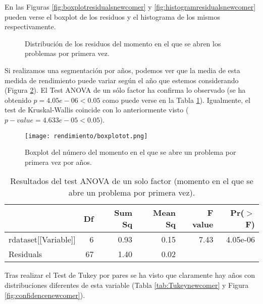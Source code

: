 En las Figuras \ref{fig:boxplotresidualsnewcomer} y \ref{fig:histogramresidualsnewcomer} pueden verse el boxplot de los residuos y el histograma de los mismos respectivamente.

\begin{figure}[H]
\centering
{}\qquad
{}
\caption{Distribución de los residuos del momento en el que se abren los problemas por primera vez.}
\label{fig:newcomer}
\end{figure}

Si realizamos una segmentación por años, podemos ver que la media de esta medida de rendimiento puede variar según el año que estemos considerando (Figura \ref{fig:boxplotnewcomer}). El Test ANOVA de un sólo factor ha confirma lo observado (se ha obtenido $p = 4.05e-06 < 0.05$ como puede verse en la Tabla \ref{tab:ANOVAnewcomer}). Igualmente, el test de Kruskal-Wallis coincide con lo anteriormente visto ($p-value = 4.633e-05 < 0.05$).

\begin{figure}[H]
    \centering
    \texttt{[image: rendimiento/boxplotot.png]}
    \caption{Boxplot del número del momento en el que se abre un problema por primera vez por años.}
    \label{fig:boxplotnewcomer}
\end{figure}

\begin{table}[H]
\centering
\caption{Resultados del test ANOVA de un solo factor (momento en el que se abre un problema por primera vez).}
\label{tab:ANOVAnewcomer}
\begin{tabular}{lrrrrr}
  \hline
 & Df & Sum Sq & Mean Sq & F value & Pr($>$F) \\ 
  \hline
rdataset[[Variable]] & 6 & 0.93 & 0.15 & 7.43 & 4.05e-06 \\ 
  Residuals            & 67 & 1.40 & 0.02 &  &  \\ 
   \hline
\end{tabular}
\end{table}

Tras realizar el Test de Tukey por pares se ha visto que claramente hay años con distribuciones diferentes de esta variable (Tabla \ref{tab:Tukeynewcomer} y Figura \ref{fig:confidencenewcomer}).

